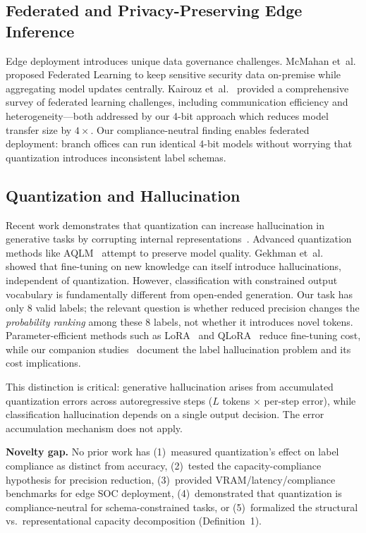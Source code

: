 \documentclass[journal]{IEEEtran}
\begin{document}
\subsection{Federated and Privacy-Preserving Edge Inference}
Edge deployment introduces unique data governance challenges. McMahan et~al.~\cite{mcmahan2017} proposed Federated Learning to keep sensitive security data on-premise while aggregating model updates centrally. Kairouz et~al.~\cite{kairouz2021} provided a comprehensive survey of federated learning challenges, including communication efficiency and heterogeneity---both addressed by our 4-bit approach which reduces model transfer size by $4\times$. Our compliance-neutral finding enables federated deployment: branch offices can run identical 4-bit models without worrying that quantization introduces inconsistent label schemas.

\subsection{Quantization and Hallucination}
Recent work demonstrates that quantization can increase hallucination in generative tasks by corrupting internal representations~\cite{huang2023}. Advanced quantization methods like AQLM~\cite{yao2024} attempt to preserve model quality. Gekhman et~al.~\cite{gekhman2024} showed that fine-tuning on new knowledge can itself introduce hallucinations, independent of quantization. However, classification with constrained output vocabulary is fundamentally different from open-ended generation. Our task has only 8 valid labels; the relevant question is whether reduced precision changes the \emph{probability ranking} among these 8 labels, not whether it introduces novel tokens. Parameter-efficient methods such as LoRA~\cite{hu2022} and QLoRA~\cite{dettmers2023} reduce fine-tuning cost, while our companion studies~\cite{p3,p7} document the label hallucination problem and its cost implications.

This distinction is critical: generative hallucination arises from accumulated quantization errors across autoregressive steps ($L$ tokens $\times$ per-step error), while classification hallucination depends on a single output decision. The error accumulation mechanism does not apply.

\textbf{Novelty gap.} No prior work has (1)~measured quantization's effect on label compliance as distinct from accuracy, (2)~tested the capacity-compliance hypothesis for precision reduction, (3)~provided VRAM/latency/compliance benchmarks for edge SOC deployment, (4)~demonstrated that quantization is compliance-neutral for schema-constrained tasks, or (5)~formalized the structural vs.\ representational capacity decomposition (Definition~1).
\end{document}
